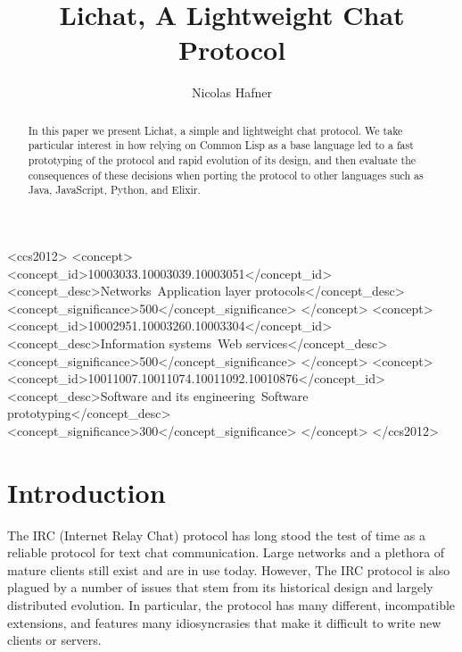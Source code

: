 \documentclass[format=sigconf]{acmart}
\begin{document}
\title{Lichat, A Lightweight Chat Protocol}

\author{Nicolas Hafner}

\begin{abstract}
  In this paper we present Lichat, a simple and lightweight chat protocol. We take particular interest in how relying on Common Lisp as a base language led to a fast prototyping of the protocol and rapid evolution of its design, and then evaluate the consequences of these decisions when porting the protocol to other languages such as Java, JavaScript, Python, and Elixir.
\end{abstract}

\begin{CCSXML}
  <ccs2012>
  <concept>
  <concept_id>10003033.10003039.10003051</concept_id>
  <concept_desc>Networks~Application layer protocols</concept_desc>
  <concept_significance>500</concept_significance>
  </concept>
  <concept>
  <concept_id>10002951.10003260.10003304</concept_id>
  <concept_desc>Information systems~Web services</concept_desc>
  <concept_significance>500</concept_significance>
  </concept>
  <concept>
  <concept_id>10011007.10011074.10011092.10010876</concept_id>
  <concept_desc>Software and its engineering~Software prototyping</concept_desc>
  <concept_significance>300</concept_significance>
  </concept>
  </ccs2012>
\end{CCSXML}



\maketitle

\newpage

\def\abovecaptionskip{1pt}
\def\listingautorefname{Listing}
\def\figureautorefname{Figure}

\section{Introduction}\label{introduction}
The IRC (Internet Relay Chat) protocol has long stood the test of time as a reliable protocol for text chat communication. Large networks and a plethora of mature clients still exist and are in use today. However, The IRC protocol is also plagued by a number of issues that stem from its historical design and largely distributed evolution. In particular, the protocol has many different, incompatible extensions, and features many idiosyncrasies that make it difficult to write new clients or servers.
\end{document}
